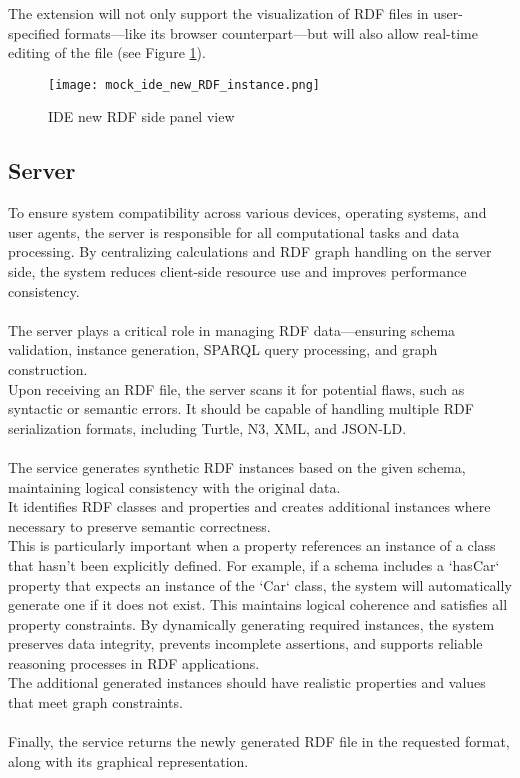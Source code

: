 The extension will not only support the visualization of RDF files in user-specified formats—like its browser counterpart—but will also allow real-time editing of the file (see Figure \ref{fig:IDERDFReader}).

\begin{figure}[htb]
    \centering
    \texttt{[image: mock\_ide\_new\_RDF\_instance.png]}\\
    \caption{IDE new RDF side panel view}\label{fig:IDERDFReader}
\end{figure}

\subsection{Server\label{sec:server}}
To ensure system compatibility across various devices, operating systems, and user agents, the server is responsible for all computational tasks and data processing. By centralizing calculations and RDF graph handling on the server side, the system reduces client-side resource use and improves performance consistency.
\\
\\
The server plays a critical role in managing RDF data—ensuring schema validation, instance generation, SPARQL query processing, and graph construction.
\\
Upon receiving an RDF file, the server scans it for potential flaws, such as syntactic or semantic errors. It should be capable of handling multiple RDF serialization formats, including Turtle, N3, XML, and JSON-LD.
\\
\\
The service generates synthetic RDF instances based on the given schema, maintaining logical consistency with the original data.
\\
It identifies RDF classes and properties and creates additional instances where necessary to preserve semantic correctness.
\\
This is particularly important when a property references an instance of a class that hasn’t been explicitly defined. For example, if a schema includes a `hasCar` property that expects an instance of the `Car` class, the system will automatically generate one if it does not exist. This maintains logical coherence and satisfies all property constraints. By dynamically generating required instances, the system preserves data integrity, prevents incomplete assertions, and supports reliable reasoning processes in RDF applications.
\\
The additional generated instances should have realistic properties and values that meet graph constraints.
\\
\\
Finally, the service returns the newly generated RDF file in the requested format, along with its graphical representation.
